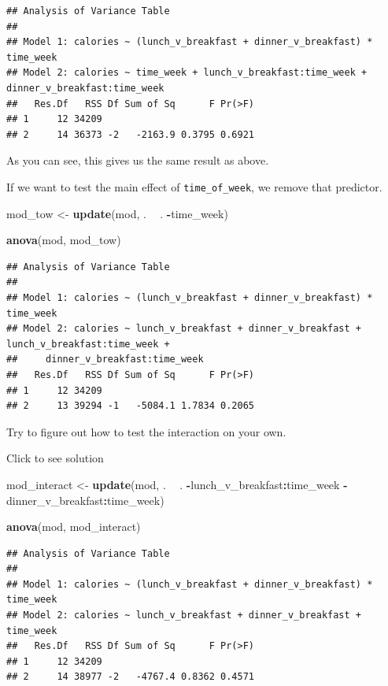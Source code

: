 \documentclass[]{book}
\newenvironment{Shaded}{\begin{snugshade}}{\end{snugshade}}
\newcommand{\KeywordTok}[1]{\textcolor[rgb]{0.13,0.29,0.53}{\textbf{#1}}}
\newcommand{\NormalTok}[1]{#1}
\newcommand{\OperatorTok}[1]{\textcolor[rgb]{0.81,0.36,0.00}{\textbf{#1}}}
\newcommand{\StringTok}[1]{\textcolor[rgb]{0.31,0.60,0.02}{#1}}
\begin{document}
\begin{verbatim}
## Analysis of Variance Table
## 
## Model 1: calories ~ (lunch_v_breakfast + dinner_v_breakfast) * time_week
## Model 2: calories ~ time_week + lunch_v_breakfast:time_week + dinner_v_breakfast:time_week
##   Res.Df   RSS Df Sum of Sq      F Pr(>F)
## 1     12 34209                           
## 2     14 36373 -2   -2163.9 0.3795 0.6921
\end{verbatim}

As you can see, this gives us the same result as above.

If we want to test the main effect of \texttt{time\_of\_week}, we remove that predictor.

\begin{Shaded}
\begin{Highlighting}[]
\NormalTok{mod_tow <-}\StringTok{ }\KeywordTok{update}\NormalTok{(mod, . }\OperatorTok{~}\StringTok{ }\NormalTok{. }\OperatorTok{-}\NormalTok{time_week)}

\KeywordTok{anova}\NormalTok{(mod, mod_tow)}
\end{Highlighting}
\end{Shaded}

\begin{verbatim}
## Analysis of Variance Table
## 
## Model 1: calories ~ (lunch_v_breakfast + dinner_v_breakfast) * time_week
## Model 2: calories ~ lunch_v_breakfast + dinner_v_breakfast + lunch_v_breakfast:time_week + 
##     dinner_v_breakfast:time_week
##   Res.Df   RSS Df Sum of Sq      F Pr(>F)
## 1     12 34209                           
## 2     13 39294 -1   -5084.1 1.7834 0.2065
\end{verbatim}

Try to figure out how to test the interaction on your own.

Click to see solution

\begin{Shaded}
\begin{Highlighting}[]
\NormalTok{mod_interact <-}\StringTok{ }\KeywordTok{update}\NormalTok{(mod, . }\OperatorTok{~}\StringTok{ }\NormalTok{. }\OperatorTok{-}\NormalTok{lunch_v_breakfast}\OperatorTok{:}\NormalTok{time_week}
                       \OperatorTok{-}\NormalTok{dinner_v_breakfast}\OperatorTok{:}\NormalTok{time_week)}

\KeywordTok{anova}\NormalTok{(mod, mod_interact)}
\end{Highlighting}
\end{Shaded}

\begin{verbatim}
## Analysis of Variance Table
## 
## Model 1: calories ~ (lunch_v_breakfast + dinner_v_breakfast) * time_week
## Model 2: calories ~ lunch_v_breakfast + dinner_v_breakfast + time_week
##   Res.Df   RSS Df Sum of Sq      F Pr(>F)
## 1     12 34209                           
## 2     14 38977 -2   -4767.4 0.8362 0.4571
\end{verbatim}
\end{document}
